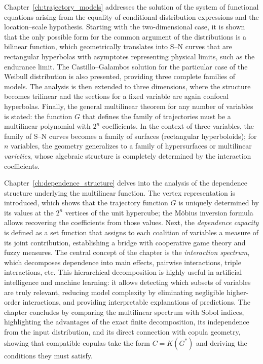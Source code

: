 Chapter~\ref{ch:trajectory_models} addresses the solution of the system of functional equations arising from the equality of conditional distribution expressions and the location–scale hypothesis. Starting with the two-dimensional case, it is shown that the only possible form for the common argument of the distributions is a bilinear function, which geometrically translates into S–N curves that are rectangular hyperbolas with asymptotes representing physical limits, such as the endurance limit. The Castillo–Galambos solution for the particular case of the Weibull distribution is also presented, providing three complete families of models. The analysis is then extended to three dimensions, where the structure becomes trilinear and the sections for a fixed variable are again confocal hyperbolas. Finally, the general multilinear theorem for any number of variables is stated: the function $G$ that defines the family of trajectories must be a multilinear polynomial with $2^n$ coefficients. In the context of three variables, the family of S–N curves becomes a family of surfaces (rectangular hyperboloids); for $n$ variables, the geometry generalizes to a family of hypersurfaces or multilinear \emph{varieties}, whose algebraic structure is completely determined by the interaction coefficients.

Chapter~\ref{ch:dependence_structure} delves into the analysis of the dependence structure underlying the multilinear function. The vertex representation is introduced, which shows that the trajectory function $G$ is uniquely determined by its values at the $2^n$ vertices of the unit hypercube; the Möbius inversion formula allows recovering the coefficients from those values. Next, the \emph{dependence capacity} is defined as a set function that assigns to each coalition of variables a measure of its joint contribution, establishing a bridge with cooperative game theory and fuzzy measures. The central concept of the chapter is the \emph{interaction spectrum}, which decomposes dependence into main effects, pairwise interactions, triple interactions, etc. This hierarchical decomposition is highly useful in artificial intelligence and machine learning: it allows detecting which subsets of variables are truly relevant, reducing model complexity by eliminating negligible higher-order interactions, and providing interpretable explanations of predictions. The chapter concludes by comparing the multilinear spectrum with Sobol indices, highlighting the advantages of the exact finite decomposition, its independence from the input distribution, and its direct connection with copula geometry, showing that compatible copulas take the form $C=K(G^*)$ and deriving the conditions they must satisfy.

